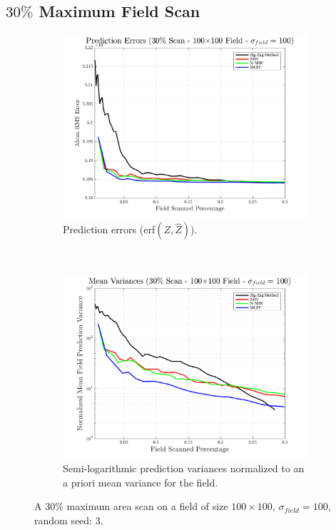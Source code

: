 \FloatBarrier
\clearpage
\subsection{$30\%$ Maximum Field Scan}
\begin{figure}[htb!]
    \centering
    \begin{subfigure}[t]{0.65\textwidth}
        \centering
        \includegraphics[width=\linewidth]{figures/hbresults/pred_errs_30p_100x100_sf_100_seed_3.png}
        \captionsetup{skip=0.20\baselineskip,size=footnotesize}
        \caption{Prediction errors (erf$(Z,\hat{Z})$).}
        \label{fig:prederrs_sigma100_p30_s3}
    \end{subfigure}%
    \\
    \begin{subfigure}[t]{0.65\textwidth}
        \centering
        \includegraphics[width=\linewidth]{figures/hbresults/vars_30p_100x100_sf_100_seed_3.png}
        \captionsetup{skip=0.20\baselineskip,size=footnotesize}
        \caption{Semi-logarithmic prediction variances normalized to an a priori mean variance for the field.}
        \label{fig:prederrs_sigma100_p30_s3}
    \end{subfigure}
    \captionsetup{skip=0.20\baselineskip}
    \caption{A $30\%$ maximum area scan on a field of size $100 \times 100$, $\sigma_{field} = 100$, random seed: 3.}
    \label{fig:sigma100_p30_s3}
\end{figure}

